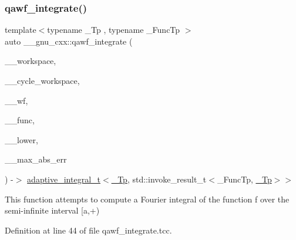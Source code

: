 \subsubsection{\texorpdfstring{qawf\+\_\+integrate()}{qawf\_integrate()}}
{\footnotesize\ttfamily template$<$typename \+\_\+\+Tp , typename \+\_\+\+Func\+Tp $>$ \\
auto \+\_\+\+\_\+gnu\+\_\+cxx\+::qawf\+\_\+integrate (\begin{DoxyParamCaption}\item[{\hyperlink{class____gnu__cxx_1_1integration__workspace}{integration\+\_\+workspace}$<$ \hyperlink{namespace____gnu__cxx_a3b19a9c800ca194374ef9172290f7d79}{\+\_\+\+Tp}, std\+::invoke\+\_\+result\+\_\+t$<$ \+\_\+\+Func\+Tp, \hyperlink{namespace____gnu__cxx_a3b19a9c800ca194374ef9172290f7d79}{\+\_\+\+Tp} $>$$>$ \&}]{\+\_\+\+\_\+workspace,  }\item[{\hyperlink{class____gnu__cxx_1_1integration__workspace}{integration\+\_\+workspace}$<$ \hyperlink{namespace____gnu__cxx_a3b19a9c800ca194374ef9172290f7d79}{\+\_\+\+Tp}, std\+::invoke\+\_\+result\+\_\+t$<$ \+\_\+\+Func\+Tp, \hyperlink{namespace____gnu__cxx_a3b19a9c800ca194374ef9172290f7d79}{\+\_\+\+Tp} $>$$>$ \&}]{\+\_\+\+\_\+cycle\+\_\+workspace,  }\item[{\hyperlink{struct____gnu__cxx_1_1oscillatory__integration__table}{oscillatory\+\_\+integration\+\_\+table}$<$ \hyperlink{namespace____gnu__cxx_a3b19a9c800ca194374ef9172290f7d79}{\+\_\+\+Tp} $>$ \&}]{\+\_\+\+\_\+wf,  }\item[{\+\_\+\+Func\+Tp}]{\+\_\+\+\_\+func,  }\item[{\hyperlink{namespace____gnu__cxx_a3b19a9c800ca194374ef9172290f7d79}{\+\_\+\+Tp}}]{\+\_\+\+\_\+lower,  }\item[{\hyperlink{namespace____gnu__cxx_a3b19a9c800ca194374ef9172290f7d79}{\+\_\+\+Tp}}]{\+\_\+\+\_\+max\+\_\+abs\+\_\+err }\end{DoxyParamCaption}) -\/$>$ \hyperlink{struct____gnu__cxx_1_1adaptive__integral__t}{adaptive\+\_\+integral\+\_\+t}$<$\hyperlink{namespace____gnu__cxx_a3b19a9c800ca194374ef9172290f7d79}{\+\_\+\+Tp}, std\+::invoke\+\_\+result\+\_\+t$<$\+\_\+\+Func\+Tp, \hyperlink{namespace____gnu__cxx_a3b19a9c800ca194374ef9172290f7d79}{\+\_\+\+Tp}$>$$>$
    }

This function attempts to compute a Fourier integral of the function f over the semi-\/infinite interval \mbox{[}a,+) 

Definition at line 44 of file qawf\+\_\+integrate.\+tcc.



